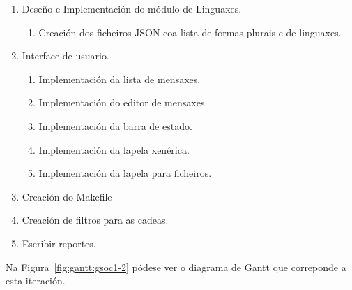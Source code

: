 \begin{enumerate}[label=\bfseries WBS 2.\arabic*]
  \item Deseño e Implementación do módulo de Linguaxes.
    \begin{enumerate}[label=\bfseries WBS 2.1.\arabic*]
      \item Creación dos ficheiros JSON coa lista de formas plurais e de linguaxes.
    \end{enumerate}
  \item Interface de usuario.
    \begin{enumerate}[label=\bfseries WBS 2.2.\arabic*]
      \item Implementación da lista de mensaxes.
      \item Implementación do editor de mensaxes.
      \item Implementación da barra de estado.
      \item Implementación da lapela xenérica.
      \item Implementación da lapela para ficheiros.
    \end{enumerate}
  \item Creación do Makefile
  \item Creación de filtros para as cadeas.
  \item Escribir reportes.
\end{enumerate}

Na Figura~\ref{fig:gantt:gsoc1-2} pódese ver o diagrama de Gantt que correponde a esta iteración.

